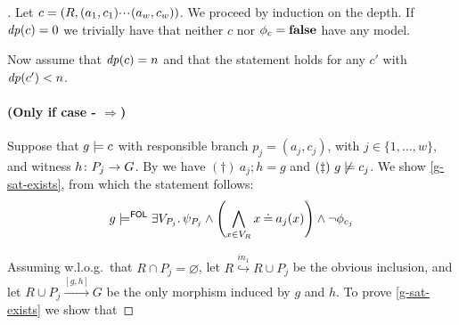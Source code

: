 \begin{proof}[]
Let $c=(R,(a_1,c_1){\cdotp\mkern-2mu\cdotp\mkern-2mu\cdotp\mkern1mu}(a_w,c_w))$. We proceed by induction on the depth. If $\mathit{dp}(c) = 0$ we trivially have that neither $c$ nor $\phi_c = \textbf{false}$ have any model.

Now assume that $\mathit{dp}(c) = n$ and that the statement holds for any $c'$ with $\mathit{dp}(c')<n$.

\paragraph{(Only if case - $\Rightarrow$)}

Suppose that $g \models c$ with responsible branch $p_j = (a_j,c_j)$, with $j \in \{1, \ldots, w\}$, and witness $h\colon P_j \rightarrow G$. By  we have $(\dagger)~ a_j;h = g$ and $(\ddagger)~ g \not \models c_j$.
%
We show \eqref{g-sat-exists}, from which the statement follows: 
\begin{equation}
  \label{eq:g-sat-exists}
g\models^{\mathsf{FOL}} \exists V_{P_j}.\, \psi_{P_j} \land \left(\bigwedge_{x \in V_{R}} x \mathbin{\doteq} a_j(x)\right) \land  \neg \phi_{c_j}
\end{equation}

Assuming w.l.o.g.~that $R\cap P_j = \varnothing$, let $R \stackrel{in_1}{\hookrightarrow} R \cup P_j$ be the obvious inclusion, and let $R\cup P_j \stackrel{[g,h]}{\longrightarrow} G$ be the only morphism induced by $g$ and $h$. To prove  \eqref{g-sat-exists} we show that 


\end{proof}
